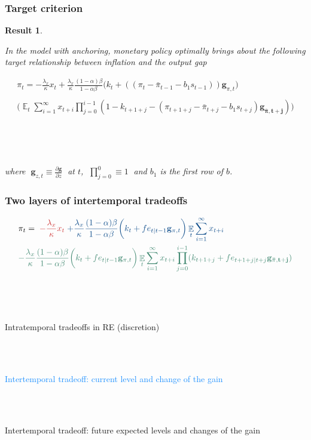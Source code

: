 \documentclass[11pt]{beamer}
\DeclareMathOperator{\E}{\mathbb{E}}
\newtheorem{result}{Result}
\begin{document}
\begin{frame}
	\frametitle{Target criterion}
	\label{anchTC}
	
	\begin{result} 

\

In the model with anchoring, monetary policy optimally brings about the following target relationship between inflation and the output gap
	
\begin{align*}
\pi_t  = -\frac{\lambda_x}{\kappa}x_t + \frac{\lambda_x}{\kappa}\frac{(1-\alpha)\beta}{1-\alpha\beta} \bigg(k_t+((\pi_t - \bar{\pi}_{t-1}-b_1 s_{t-1}))\mathbf{g}_{\pi,t}\bigg) \\
\\
\bigg(\E_t\sum_{i=1}^{\infty}x_{t+i}\prod_{j=0}^{i-1}(1-k_{t+1+j} - (\pi_{t+1+j} - \bar{\pi}_{t+j}-b_1 s_{t+j})\mathbf{g_{\bar{\pi}, t+j}}) \bigg)
 \label{target}
\end{align*}

\

\

where $\; \mathbf{g}_{z,t} \equiv \frac{\partial \mathbf{g}}{\partial z}\;$ at $t$, $\; \prod_{j=0}^{0} \equiv 1 \; $ and $b_1$ is the first row of $b$.
	\end{result}

\vspace{-0.1cm}

\hfill \hyperlink{generalTC}{}

\end{frame}

\begin{frame}
	\frametitle{Two layers of intertemporal tradeoffs}
\small{
\begin{align*}
& \pi_t  =  \; \textcolor{brownreddark}{-\frac{\lambda_x}{\kappa} x_t} \textcolor{dodgerblue}{ \; + \frac{\lambda_x}{\kappa} \frac{(1-\alpha)\beta}{1-\alpha\beta} \bigg(k_t+ fe_{t|t-1}\mathbf{g}_{\pi,t} \bigg)\E_t\sum_{i=1}^{\infty}x_{t+i}}  \\
& \textcolor{aquamarinegreen}{- \frac{\lambda_x}{\kappa} \frac{(1-\alpha)\beta}{1-\alpha\beta} \bigg(k_t+ fe_{t|t-1}\mathbf{g}_{\pi,t} \bigg)\E_t\sum_{i=1}^{\infty}x_{t+i}\prod_{j=0}^{i-1}(k_{t+1+j}+ fe_{t+1+j|t+j}\mathbf{g_{\bar{\pi},t+j}} )}
\end{align*}

\

\

\textcolor{brownreddark}{Intratemporal tradeoffs in RE (discretion)} \\

\

\

\textcolor{dodgerblue}{Intertemporal tradeoff: current level and change of the gain } \\

\

\

\textcolor{aquamarinegreen}{Intertemporal tradeoff: future expected levels and changes of the gain}

}
\end{frame}
\end{document}
